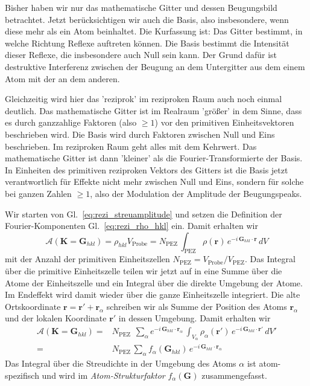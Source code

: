 Bisher haben wir nur das mathematische Gitter und dessen Beugungsbild betrachtet. Jetzt berücksichtigen wir auch die Basis, also insbesondere, wenn diese mehr als ein Atom beinhaltet. Die Kurfassung ist: Das Gitter bestimmt, in welche Richtung Reflexe auftreten können. Die Basis bestimmt die Intensität dieser Reflexe, die insbesondere auch Null sein kann. Der Grund dafür ist destruktive Interferenz zwischen der Beugung an dem Untergitter aus dem einem Atom mit der an dem anderen.

Gleichzeitig wird hier das 'reziprok' im reziproken Raum auch noch einmal deutlich. Das mathematische Gitter ist im Realraum 'größer' in dem Sinne, dass es durch ganzzahlige Faktoren (also $\ge 1$) vor den primitiven Einheitsvektoren beschrieben wird. Die Basis wird durch Faktoren zwischen Null und Eins beschrieben. Im reziproken Raum geht alles mit dem Kehrwert. Das mathematische Gitter ist dann 'kleiner' als die Fourier-Transformierte der Basis. In Einheiten des primitiven reziproken Vektors des Gitters ist die Basis jetzt verantwortlich für Effekte nicht mehr zwischen Null und Eins, sondern für solche bei ganzen Zahlen $\ge 1$, also der Modulation der Amplitude der Beugungspeaks.

Wir starten von Gl.~\ref{eq:rezi_streuamplitude} und setzen die Definition der Fourier-Komponenten Gl.~\ref{eq:rezi_rho_hkl} ein. Damit erhalten wir
\begin{equation}
\mathcal{A}(\mathbf{K} = \mathbf{G}_{hkl} ) 
=  \rho_{hkl} V_\text{Probe}
=  N_\text{PEZ} \, \int_\text{PEZ}    \rho(\mathbf{r})\,  e^{-i \, \mathbf{G}_{hkl} \cdot \mathbf{r}} \, dV 
\end{equation}
mit der Anzahl der primitiven Einheitszellen $ N_\text{PEZ} =  V_\text{Probe} / V_\text{PEZ}$.
Das Integral über die primitive Einheitszelle teilen wir jetzt auf in eine Summe über die Atome der Einheitszelle und ein Integral über die direkte Umgebung der Atome. Im Endeffekt wird damit wieder über die ganze Einheitszelle integriert. Die alte Ortskoordinate  $\mathbf{r} =  \mathbf{r}' +  \mathbf{r}_\alpha$ schreiben wir als Summe der Position des Atoms  $\mathbf{r}_\alpha$ und der lokalen Koordinate $\mathbf{r}'$ in dessen Umgebung. Damit erhalten wir
\begin{align}
\mathcal{A}(\mathbf{K} = \mathbf{G}_{hkl} ) 
=   &  N_\text{PEZ}  \, \
\sum_\alpha e^{-i \, \mathbf{G}_{hkl} \cdot \mathbf{r}_\alpha} \, \int_{V_\alpha}  
 \rho_\alpha(\mathbf{r'})\,  e^{-i \, \mathbf{G}_{hkl} \cdot \mathbf{r'}} \, dV' \\
 = &
 N_\text{PEZ} \, 
\sum_\alpha f_\alpha ( \mathbf{G}_{hkl} ) \, e^{-i \, \mathbf{G}_{hkl} \cdot \mathbf{r}_\alpha} 
\end{align}
Das Integral über die Streudichte in der Umgebung des Atoms $\alpha$ ist atom-spezifisch und wird im \emph{Atom-Strukturfaktor} $f_\alpha ( \mathbf{G} )$ zusammengefasst.

